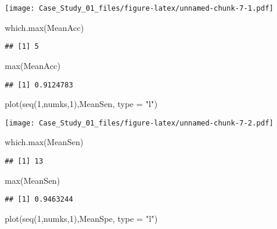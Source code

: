 \documentclass[
]{article}
\newenvironment{Shaded}{\begin{snugshade}}{\end{snugshade}}
\newcommand{\AttributeTok}[1]{\textcolor[rgb]{0.77,0.63,0.00}{#1}}
\newcommand{\DecValTok}[1]{\textcolor[rgb]{0.00,0.00,0.81}{#1}}
\newcommand{\FunctionTok}[1]{\textcolor[rgb]{0.00,0.00,0.00}{#1}}
\newcommand{\NormalTok}[1]{#1}
\newcommand{\StringTok}[1]{\textcolor[rgb]{0.31,0.60,0.02}{#1}}
\begin{document}
\texttt{[image: Case\_Study\_01\_files/figure-latex/unnamed-chunk-7-1.pdf]}

\begin{Shaded}
\begin{Highlighting}[]
\FunctionTok{which.max}\NormalTok{(MeanAcc)}
\end{Highlighting}
\end{Shaded}

\begin{verbatim}
## [1] 5
\end{verbatim}

\begin{Shaded}
\begin{Highlighting}[]
\FunctionTok{max}\NormalTok{(MeanAcc)}
\end{Highlighting}
\end{Shaded}

\begin{verbatim}
## [1] 0.9124783
\end{verbatim}

\begin{Shaded}
\begin{Highlighting}[]
\FunctionTok{plot}\NormalTok{(}\FunctionTok{seq}\NormalTok{(}\DecValTok{1}\NormalTok{,numks,}\DecValTok{1}\NormalTok{),MeanSen, }\AttributeTok{type =} \StringTok{"l"}\NormalTok{)}
\end{Highlighting}
\end{Shaded}

\texttt{[image: Case\_Study\_01\_files/figure-latex/unnamed-chunk-7-2.pdf]}

\begin{Shaded}
\begin{Highlighting}[]
\FunctionTok{which.max}\NormalTok{(MeanSen)}
\end{Highlighting}
\end{Shaded}

\begin{verbatim}
## [1] 13
\end{verbatim}

\begin{Shaded}
\begin{Highlighting}[]
\FunctionTok{max}\NormalTok{(MeanSen)}
\end{Highlighting}
\end{Shaded}

\begin{verbatim}
## [1] 0.9463244
\end{verbatim}

\begin{Shaded}
\begin{Highlighting}[]
\FunctionTok{plot}\NormalTok{(}\FunctionTok{seq}\NormalTok{(}\DecValTok{1}\NormalTok{,numks,}\DecValTok{1}\NormalTok{),MeanSpe, }\AttributeTok{type =} \StringTok{"l"}\NormalTok{)}
\end{Highlighting}
\end{Shaded}
\end{document}
